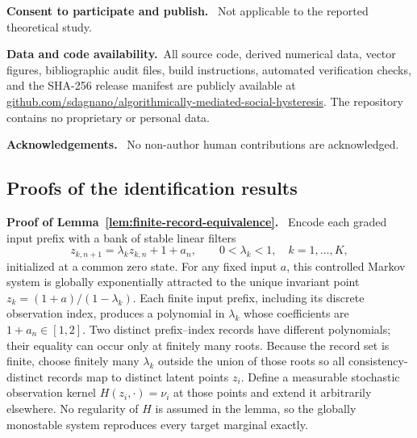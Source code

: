 \documentclass[pdflatex,sn-mathphys-num]{sn-jnl}
\newcommand{\inlinehead}[1]{\par\smallskip\noindent\textbf{#1}\ }
\begin{document}
\inlinehead{Consent to participate and publish.} Not applicable to the reported theoretical study.

\inlinehead{Data and code availability.}All source code, derived numerical data, vector figures, bibliographic audit files, build instructions, automated verification checks, and the SHA-256 release manifest are publicly available at \href{https://github.com/sdagnano/algorithmically-mediated-social-hysteresis}{github.com/sdagnano/algorithmically-mediated-social-hysteresis}. The repository contains no proprietary or personal data.

\inlinehead{Acknowledgements.} No non-author human contributions are acknowledged.

\begin{appendices}
\renewcommand{\theHequation}{\Alph{section}.\arabic{equation}}
\renewcommand{\theHtable}{\Alph{section}.\arabic{table}}
\renewcommand{\theHfigure}{\Alph{section}.\arabic{figure}}

\section{Proofs of the identification results}

\inlinehead{Proof of Lemma~\ref{lem:finite-record-equivalence}.} Encode each graded input prefix with a bank of stable linear filters
\begin{equation}
z_{k,n+1}=\lambda_k z_{k,n}+1+a_n,
\qquad 0<\lambda_k<1,\quad k=1,\ldots,K,
\end{equation}
initialized at a common zero state. For any fixed input $a$, this controlled Markov system is globally exponentially attracted to the unique invariant point $z_k=(1+a)/(1-\lambda_k)$. Each finite input prefix, including its discrete observation index, produces a polynomial in $\lambda_k$ whose coefficients are $1+a_n\in[1,2]$. Two distinct prefix--index records have different polynomials; their equality can occur only at finitely many roots. Because the record set is finite, choose finitely many $\lambda_k$ outside the union of those roots so all consistency-distinct records map to distinct latent points $z_i$. Define a measurable stochastic observation kernel $H(z_i,\cdot)=\nu_i$ at those points and extend it arbitrarily elsewhere. No regularity of $H$ is assumed in the lemma, so the globally monostable system reproduces every target marginal exactly.


\end{appendices}
\end{document}
